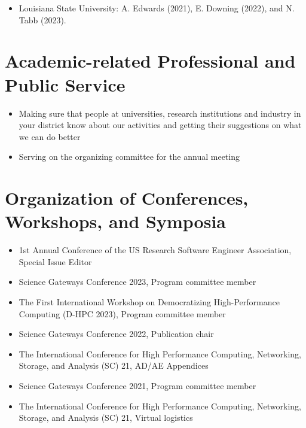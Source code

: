 \documentclass[11pt,a4paper,sans]{moderncv}
\begin{document}
\begin{itemize}[leftmargin=4cm]
\item Louisiana State University: A. Edwards (2021), E. Downing (2022), and N. Tabb (2023).
\end{itemize}


\section{Academic-related Professional and Public Service}

\begin{itemize}[leftmargin=4cm]
\item Making sure that people at universities, research institutions and industry in your district know
  about our activities and getting their suggestions on what we can do better
\item Serving on the organizing committee for the annual meeting
\end{itemize}

\section{Organization of Conferences, Workshops, and Symposia}
\begin{itemize}[leftmargin=4cm]
\item 1st Annual Conference of the US Research Software Engineer Association, Special Issue Editor
\item Science Gateways Conference 2023, Program committee member
\item The First International Workshop on
Democratizing High-Performance Computing (D-HPC 2023), Program committee member
\item Science Gateways Conference 2022, Publication chair
\item The International Conference for High Performance Computing, Networking, Storage, and Analysis (SC) 21, AD/AE Appendices
\item Science Gateways Conference 2021, Program committee member
\item The International Conference for High Performance Computing, Networking, Storage, and Analysis (SC) 21, Virtual logistics
\end{itemize}
\end{document}
